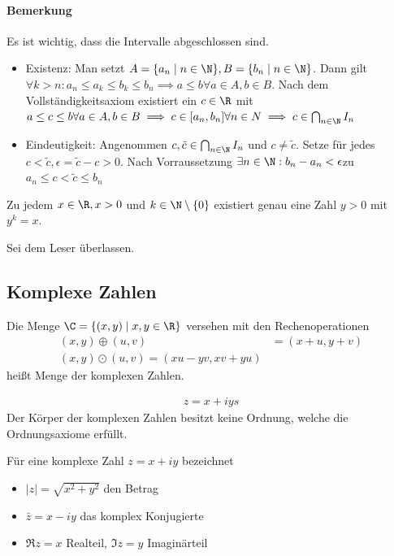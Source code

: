 \paragraph{Bemerkung} Es ist wichtig, dass die Intervalle abgeschlossen sind. \prove \begin{itemize}
	\item Existenz: Man setzt $A=\{a_n\mid n\in \N\}, B=\{b_n\mid n\in \N\}$. Dann gilt
	      $\forall k>n: a_n\leq a_k \leq b_k \leq b_n\implies a\leq b \forall a\in A,
		      b\in B$. Nach dem Vollständigkeitsaxiom existiert ein $c\in \R$ mit $a\leq
		      c\leq b \forall a\in A,b\in B\implies c \in[a_n,b_n] \forall n \in N \implies c
		      \in \bigcap_{n\in\N} I_n$
	\item Eindeutigkeit: Angenommen $c,\tilde{c}\in\bigcap_{n\in\N}I_n$ und $c\neq
		      \tilde{c}$. Setze für jedes $c< \tilde{c}, \epsilon =\tilde{c}-c>0$. Nach
	      Vorraussetzung $\exists n\in\N: b_n-a_n<\epsilon$\lightning zu $a_n\leq
		      c<\tilde{c}\leq b_n$
\end{itemize}
\begin{theorem}
	Zu jedem $x\in \R, x>0$ und $k\in\N\setminus\{0\}$ existiert genau eine Zahl $y>0$ mit $y^k=x$.
\end{theorem}
\prove Sei dem Leser überlassen.
\subsection{Komplexe Zahlen}
\begin{definition}
	Die Menge $\C=\{(x,y)\mid x,y\in\R\}$ versehen mit den Rechenoperationen
	\begin{align*}
		(x,y)\oplus (u,v) &=(x+u, y+v)\\
		(x,y)\odot (u,v) =(xu-yv,xv+yu)
	\end{align*}
	heißt Menge der komplexen Zahlen.
\end{definition}
\begin{align*}
	z=x+iys
\end{align*}
Der Körper der komplexen Zahlen besitzt keine Ordnung, welche die Ordnungsaxiome erfüllt. 
\begin{definition}
	Für eine komplexe Zahl $z=x+iy$ bezeichnet
	\begin{itemize}
		\item $|z|=\sqrt{x^2+y^2}$ den Betrag
		\item $\bar{z}=x-iy$ das komplex Konjugierte
		\item $\Re{z}=x$ Realteil, $\Im{z}=y$ Imaginärteil
	\end{itemize}
\end{definition}

